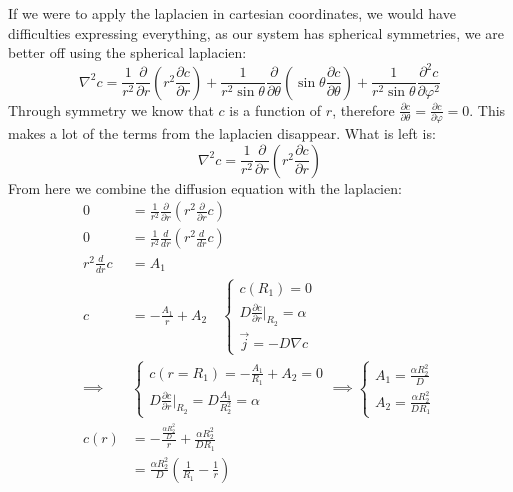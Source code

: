 If we were to apply the laplacien in cartesian coordinates, we would have difficulties expressing everything, as our system has spherical symmetries, we are better off using the spherical laplacien:
\begin{equation*}
	\nabla^2c = \frac 1{r^2}\frac\partial {\partial r}\left(r^2\frac{\partial c}{\partial r}\right) + \frac 1{r^2\sin\theta}\frac{\partial}{\partial \theta}\left(\sin\theta \frac{\partial c}{\partial \theta}\right) + \frac 1{r^2\sin\theta}\frac{\partial ^2c}{\partial \varphi^2}
\end{equation*}
Through symmetry we know that $c$ is a function of $r$, therefore $\frac{\partial c}{\partial \theta}=\frac{\partial c}{\partial \varphi}=0$. This makes a lot of the terms from the laplacien disappear. What is left is:
\begin{equation*}
	\nabla^2c = \frac 1{r^2}\frac\partial {\partial r}\left(r^2\frac{\partial c}{\partial r}\right)
\end{equation*}
From here we combine the diffusion equation with the laplacien:
\begin{equation*}
	\begin{split}
		0 &= \frac{1}{r^2}\frac{\partial}{\partial r} \left(r^2 \frac{\partial}{\partial r}c\right)\\
		0&=\frac{1}{r^2}\frac{d}{dr}\left(r^2\frac{d}{dr}c\right)\\
		r^2\frac d{dr} c &= A_1\\
		c &= -\frac{A_1}r + A_2\quad
		\begin{cases}
			c(R_1)=0\\
			D\frac{\partial c}{\partial r}\Big|_{R_2} = \alpha\\
			\vec{j} = -D\nabla c
		\end{cases}\\
		\implies & \begin{cases}
		c(r=R_1) = -\frac{A_1}{R_1} + A_2 = 0\\
		D\frac{\partial c}{\partial r}\Big|_{R_2}= D\frac{A_1}{R_2^2}  =\alpha
		\end{cases}\implies \begin{cases}
		A_1=\frac {\alpha R_2^2}{D}\\
		A_2= \frac{\alpha R_2^2}{DR_1}
		\end{cases}\\
		c(r)&=-\frac{\frac {\alpha R_2^2}{D}}{r} + \frac{\alpha R_2^2}{DR_1}\\
		&= \frac{\alpha R_2^2}{D}\left(\frac 1{R_1}-\frac 1{r}\right)
	\end{split}
\end{equation*}

